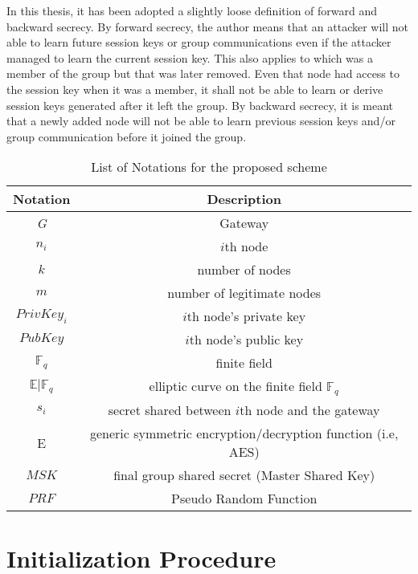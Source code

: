 In this thesis, it has been adopted a slightly loose definition of forward and backward secrecy. 
By forward secrecy, the author means that an attacker will not able to learn future session keys or group communications even if the attacker managed to learn the current session key.
This also applies to which was a member of the group but that was later removed. 
Even that node had access to the session key when it was a member, it shall not be able to learn or derive session keys generated after it left the group. 
By backward secrecy, it is meant that a newly added node will not be able to learn previous session keys and/or group communication before it joined the group. 

\begin{table}[h]
\caption{List of Notations for the proposed scheme }
\label{notations}
\begin{center}
\begin{tabular}{|c||c|}
\hline
\textbf{Notation} & \textbf{Description}\\
\hline
\textit{G} & Gateway\\
\hline
$n_i$ & $i$th node\\
\hline
$k$ & number of nodes\\
\hline
$m$ & number of legitimate nodes\\
\hline
$PrivKey_i$ & $i$th node's private key\\
\hline
$PubKey$ & $i$th node's public key \\
\hline
$\mathbb{F}_q$ & finite field\\
\hline
$\mathbb{E}|\mathbb{F}_q$ & elliptic curve on the finite field $\mathbb{F}_q$\\
\hline
$s_i$ & secret shared between $i$th node and the gateway \\
\hline
E & generic symmetric encryption/decryption function (i.e, AES) \\
\hline
$MSK$ & final group shared secret (Master Shared Key) \\
\hline
$PRF$ & Pseudo Random Function \\
\hline
\end{tabular}
\end{center}
\end{table}

\section{Initialization Procedure}



